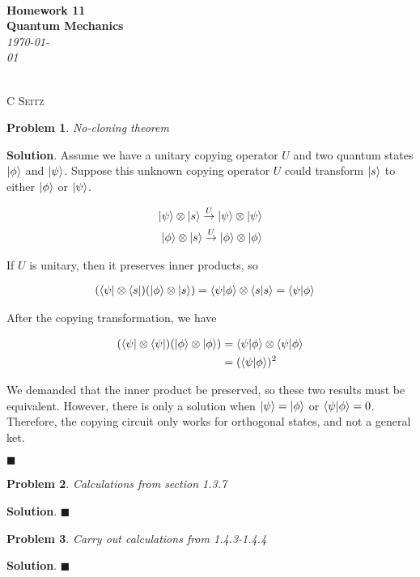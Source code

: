 \documentclass[12pt]{article}
\newtheorem{p}{Problem}
\theoremstyle{definition}
\newenvironment{s}{%
        \begin{trivlist} \item \textbf{Solution}. }{%
            \hspace*{\fill} $\blacksquare$\end{trivlist}}%
\begin{document}
 {\noindent\Huge\bf  \\[0.5\baselineskip] {\selectfont  Homework 11}         }\\[2\baselineskip] %
{ {\bf {}\selectfont Quantum Mechanics}\\ {\textit{\selectfont     \today}}}~~~~~~~~~~~~~~~~~~~~~~~~~~~~~~~~~~~~~~~~~~~~~~~~~~~~~~~~~~~~~~~~~~~~~~~~~~~~~    {\large \textsc{C Seitz}
\\[1.4\baselineskip] 


\begin{p}
No-cloning theorem
\end{p}

\begin{s}
Assume we have a unitary copying operator $U$ and two quantum states $\ket{\phi}$ and $\ket{\psi}$. Suppose this unknown copying operator $U$ could transform $\ket{s}$ to either $\ket{\phi}$ or $\ket{\psi}$.

\begin{align*}
\ket{\psi} \otimes \ket{s} \overset{U}{\rightarrow} \ket{\psi} \otimes \ket{\psi}\\
\ket{\phi} \otimes \ket{s} \overset{U}{\rightarrow} \ket{\phi} \otimes \ket{\phi}
\end{align*}

If $U$ is unitary, then it preserves inner products, so

\begin{align*}
(\bra{\psi} \otimes \bra{s})(\ket{\phi} \otimes \ket{s}) &= \bra{\psi}\ket{\phi} \otimes \bra{s}\ket{s} = \bra{\psi}\ket{\phi}
\end{align*}

After the copying transformation, we have

\begin{align*}
(\bra{\psi} \otimes \bra{\psi})(\ket{\phi} \otimes \ket{\phi}) &= \bra{\psi}\ket{\phi}\otimes\bra{\psi}\ket{\phi}\\
&= (\bra{\psi}\ket{\phi})^{2}
\end{align*}

We demanded that the inner product be preserved, so these two results must be equivalent. However, there is only a solution when $\ket{\psi} = \ket{\phi}$ or $\bra{\psi}\ket{\phi} = 0$. Therefore, the copying circuit only works for orthogonal states, and not a general ket.

\end{s}

\begin{p}
Calculations from section 1.3.7
\end{p}

\begin{s}
\end{s}

\begin{p}
Carry out calculations from 1.4.3-1.4.4
\end{p}

\begin{s}
\end{s}
\end{document}
